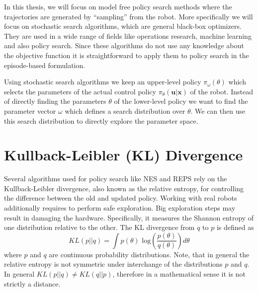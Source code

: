 

In this thesis, we will focus on model free policy search methods
where the trajectories are generated by ``sampling'' from
the robot.
More specifically we will focus on stochastic
search algorithms, which are general black-box optimizers.
They are used in a wide range of fields like operations research,
machine learning and also policy search.
Since these algorithms do not use any knowledge about the
objective function it is straightforward to
apply them to policy search in the episode-based formulation.

Using stochastic search algorithms we keep an upper-level policy
$\pi_{\omega}(\theta)$ which selects the parameters of the
actual control policy $\pi_{\theta}(\mathbf{u} | \mathbf{x})$ of the robot.
Instead of directly finding the parameters $\theta$ of the
lower-level policy we want to find the parameter vector $\omega$ which
defines a search distribution over $\theta$. We can then use this
search distribution to directly explore the parameter space.


\section{Kullback-Leibler (KL) Divergence}
Several algorithms used for policy search like
NES \citep{wierstra2014natural} and REPS \citep{peters2010relative}
rely on the Kullback-Leibler divergence, also
known as the relative entropy, for controlling
the difference between the old and updated policy.
Working with real robots additionally requires to perform safe exploration. Big
exploration steps may result in damaging the hardware.
Specifically, it measures the Shannon entropy of one distribution relative to the
other. The KL divergence from $q$ to $p$ is defined as
$$ KL(p || q) = \int p(\theta) \text{ log} \left(\frac{p(\theta)}{q(\theta)}\right)
d \theta $$
where $p$ and $q$ are continuous probability distributions.
Note, that in general the relative entropy is not symmetric under interchange of the
distributions $p$ and $q$. In general $KL(p || q) \neq KL(q || p) $, therefore
in a mathematical sense it is not strictly a distance.

